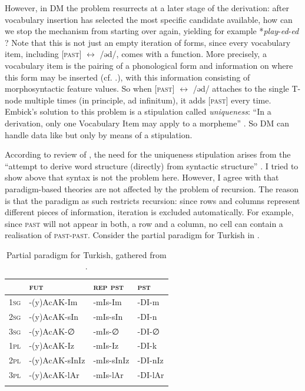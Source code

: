 \documentclass[output=paper]{langsci/langscibook}
\begin{document}
However, in DM the problem resurrects at a later stage of the derivation: after vocabulary insertion has selected the most specific candidate available, how can we stop the mechanism from starting over again, yielding for example *\textit{play}{}-\textit{ed}{}-\textit{ed} \citep[97]{Embick2015}? Note that this is not just an empty iteration of forms, since every vocabulary item, including [\textsc{past}] $\leftrightarrow $ /əd/, comes with a function. More precisely, a vocabulary item is the pairing of a phonological form and information on where this form may be inserted (cf. .), with this information consisting of morphosyntactic feature values. So when [\textsc{past}] $\leftrightarrow $ /əd/ attaches to the single T-node multiple times (in principle, ad infinitum), it adds [\textsc{past}] every time. Embick’s solution to this problem is a stipulation called \textit{uniqueness}: “In a derivation, only one Vocabulary Item may apply to a morpheme” \citep[98]{Embick2015}. So DM can handle data like  but only by means of a stipulation.

According to  review of \citet{Embick2015}, the need for the uniqueness stipulation arises from the “attempt to derive word structure (directly) from syntactic structure” \citep[218]{Spencer2019}. I tried to show above that syntax is not the problem here. However, I agree with \citet{Spencer2019} that paradigm-based theories are not affected by the problem of recursion. The reason is that the paradigm as such restricts recursion: since rows and columns represent different pieces of information, iteration is excluded automatically. For example, since \textsc{past} will not appear in both, a row and a column, no cell can contain a realisation of \textsc{past}{}-\textsc{past}. Consider the partial paradigm for Turkish in .

\begin{table}
\caption{Partial paradigm for Turkish, gathered from \citet[ch. 2.1.3]{Kornfilt1997}.\label{tab:reiner:12}}
\begin{tabular}{llll}
\lsptoprule
               & {\textsc{fut}} & {\textsc{rep pst}} & {\textsc{pst}}\\\midrule
{\textsc{1sg}} & {}-(y)AcAK{}-Im &     {}-mIs-Im &    {}-DI-m\\
{\textsc{2sg}} & {}-(y)AcAK{}-sIn &    {}-mIs-sIn &   {}-DI-n \\
{\textsc{3sg}} & {}-(y)AcAK{}-∅ &      {}-mIs-∅   &   {}-DI-∅\\
{\textsc{1pl}} & {}-(y)AcAK{}-Iz &     {}-mIs-Iz &    {}-DI-k\\
{\textsc{2pl}} & {}-(y)AcAK{}-sInIz &  {}-mIs-sInIz & {}-DI-nIz\\
{\textsc{3pl}} & {}-(y)AcAK{}-lAr &    {}-mIs-lAr &   {}-DI-lAr\\
\lspbottomrule
\end{tabular}
\end{table}
\end{document}
